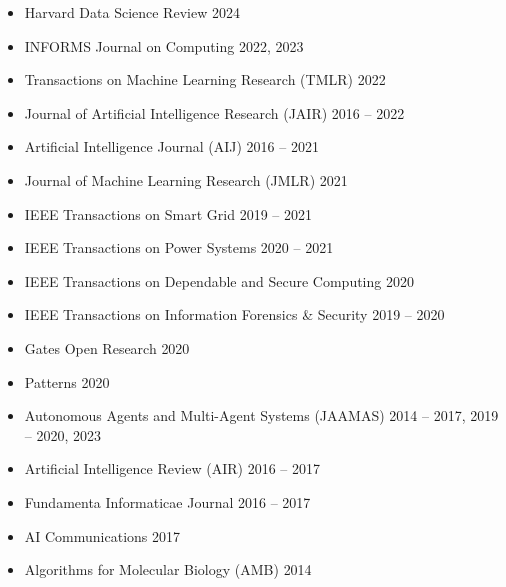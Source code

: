 \begin{itemize}
  \item Harvard Data Science Review \hfill{2024} 

  \item INFORMS Journal on Computing \hfill{2022, 2023}
  
  \item  Transactions on Machine Learning Research (TMLR) \hfill{2022}

  \item Journal of Artificial Intelligence Research (JAIR) \hfill{2016 -- 2022}

  \item Artificial Intelligence Journal (AIJ) \hfill{2016 -- 2021}

  \item Journal of Machine Learning Research (JMLR) \hfill{2021}
 
  \item IEEE Transactions on Smart Grid \hfill{2019 -- 2021}

  \item IEEE Transactions on Power Systems \hfill{2020 -- 2021}

  \item IEEE Transactions on Dependable and Secure Computing \hfill{2020}

  \item IEEE Transactions on Information Forensics \& Security \hfill{2019 -- 2020}

  \item Gates Open Research \hfill{2020}

  \item Patterns \hfill{2020}

  \item Autonomous Agents and Multi-Agent Systems (JAAMAS) \hfill {2014 -- 2017, 2019 -- 2020, 2023}

  \item Artificial Intelligence Review (AIR) \hfill{2016 -- 2017}
  \item Fundamenta Informaticae Journal \hfill{2016 -- 2017}
  \item AI Communications \hfill{2017}  
  \item Algorithms for Molecular Biology (AMB) \hfill {2014}
\end{itemize}

